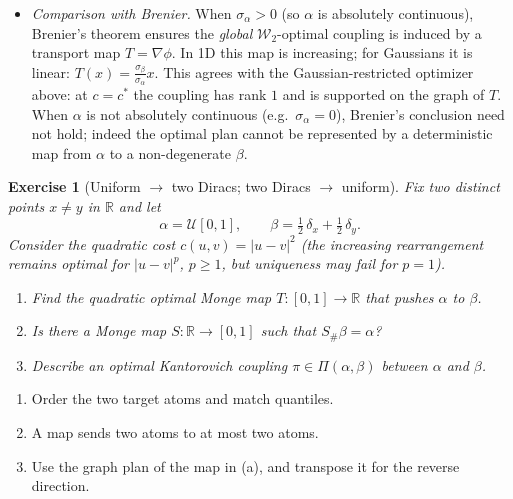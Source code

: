 \documentclass[11pt,a4paper]{article}
\theoremstyle{exostyle}
\newtheorem{exercise}{Exercise}
\newcommand{\R}{\mathbb{R}}
\newcommand{\Wtwo}{\mathcal{W}_2}
\newcommand{\Unif}{\mathcal U}
\begin{document}
\begin{solution}
\begin{itemize}[itemsep=2pt]
\item \emph{Comparison with Brenier.}
When $\sigma_\alpha>0$ (so $\alpha$ is absolutely continuous), Brenier's theorem ensures the \emph{global} $\Wtwo$-optimal coupling is induced by a transport map $T=\nabla\phi$.
In 1D this map is increasing; for Gaussians it is linear: $T(x)=\frac{\sigma_\beta}{\sigma_\alpha}x$.
This agrees with the Gaussian-restricted optimizer above: at $c=c^*$ the coupling has rank $1$ and is supported on the graph of $T$.
When $\alpha$ is not absolutely continuous (e.g.\ $\sigma_\alpha=0$), Brenier's conclusion need not hold; indeed the optimal plan cannot be represented by a deterministic map from $\alpha$ to a non-degenerate $\beta$.
\end{itemize}
\end{solution}

\begin{exercise}[Uniform $\to$ two Diracs; two Diracs $\to$ uniform]\label{ex:uniform-to-two-atoms}
Fix two distinct points $x\neq y$ in $\R$ and let
\[
\alpha=\Unif[0,1],\qquad \beta=\tfrac12\,\delta_x+\tfrac12\,\delta_y.
\]
Consider the quadratic cost $c(u,v)=|u-v|^2$ (the increasing rearrangement remains optimal for $|u-v|^p$, $p\ge1$, but uniqueness may fail for $p=1$).
\begin{enumerate}[label=(\alph*), itemsep=4pt]
\item Find the quadratic optimal Monge map $T:[0,1]\to\R$ that pushes $\alpha$ to $\beta$.
\item Is there a Monge map $S:\R\to[0,1]$ such that $S_\#\beta=\alpha$?
\item Describe an optimal Kantorovich coupling $\pi\in\Pi(\alpha,\beta)$ between $\alpha$ and $\beta$.
\end{enumerate}
\end{exercise}
\begin{hints}
\begin{enumerate}[label=(\alph*)]\item Order the two target atoms and match quantiles.\item A map sends two atoms to at most two atoms.\item Use the graph plan of the map in (a), and transpose it for the reverse direction.\end{enumerate}
\end{hints}
\end{document}

